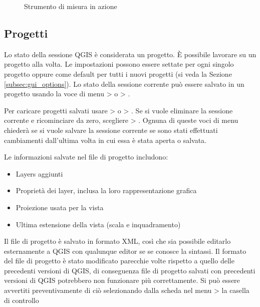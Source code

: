 \begin{figure}[h]
\caption{Strumento di misura in azione \nixcaption} \label{fig:measure}
\centering
   \goodgap
\end{figure}

\subsection{Progetti}\label{sec:projects}

Lo stato della sessione QGIS è considerata un progetto. 
È possibile lavorare su un progetto alla volta. Le impostazioni possono essere settate 
per ogni singolo progetto oppure come default per tutti i nuovi progetti (si veda la Sezione
\ref{subsec:gui_options}). Lo stato della sessione corrente può essere salvato
in un progetto usando la voce di menu  >
o  > .

Per caricare progetti salvati usare  >
o  > .
Se si vuole eliminare la sessione corrente e ricominciare da zero, scegliere
 > .
Ognuna di queste voci di menu chiederà se si vuole salvare la sessione
corrente se sono stati effettuati cambiamenti dall'ultima volta in cui essa è
stata aperta o salvata.

Le informazioni salvate nel file di progetto includono:

\begin{itemize}
\item Layers aggiunti
\item Proprietà dei layer, inclusa la loro rappresentazione grafica
\item Proiezione usata per la vista
\item Ultima estensione della vista (scala e inquadramento)
\end{itemize}

Il file di progetto è salvato in formato XML, così che sia possibile editarlo
esternamente a QGIS con qualunque editor se se conosce la sintassi. Il formato
del file di progetto è stato modificato parecchie volte rispetto a quello
delle precedenti versioni di QGIS, di conseguenza file di progetto salvati con
precedenti versioni di QGIS potrebbero non funzionare più correttamente. Si
può essere avvertiti preventivamente di ciò selezionando dalla scheda
 nel menu  >  
la casella di controllo 

